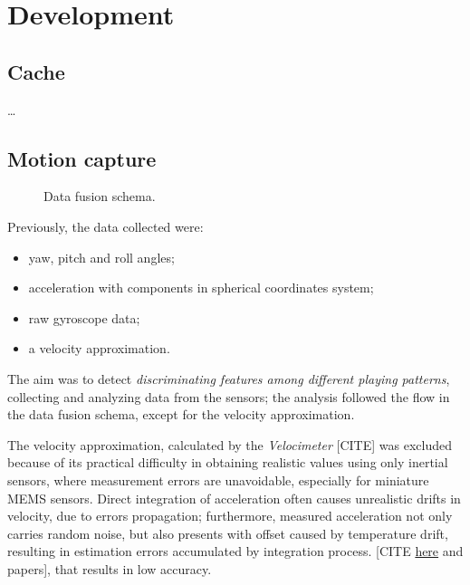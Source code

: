 \chapter{Development}

\section{Cache}
\dots

\section{Motion capture}
\begin{center}
	\begin{figure}[ht!]
		\caption{Data fusion schema.}
	\end{figure}
\end{center}
Previously, the data collected were:
\begin{itemize}
	\item yaw, pitch and roll angles;
	\item acceleration with components in spherical coordinates system;
	\item raw gyroscope data;
	\item a velocity approximation.
\end{itemize}
\bigbreak

The aim was to detect \textit{discriminating features among different playing patterns}, collecting and analyzing data from the sensors; the analysis followed the flow in the data fusion schema, except for the velocity approximation.
\bigbreak

The velocity approximation, calculated by the \textit{Velocimeter} [CITE] was excluded because of its practical difficulty in obtaining realistic values using only inertial sensors, where measurement errors are unavoidable, especially for miniature MEMS sensors. Direct integration of acceleration often causes unrealistic drifts in velocity, due to errors propagation; furthermore, measured acceleration not only carries random noise, but also presents with offset caused by temperature drift, resulting in estimation errors accumulated by integration process. [CITE \href{http://www.chrobotics.com/library/accel-position-velocity}{here} and papers], that results in low accuracy.
\bigbreak

